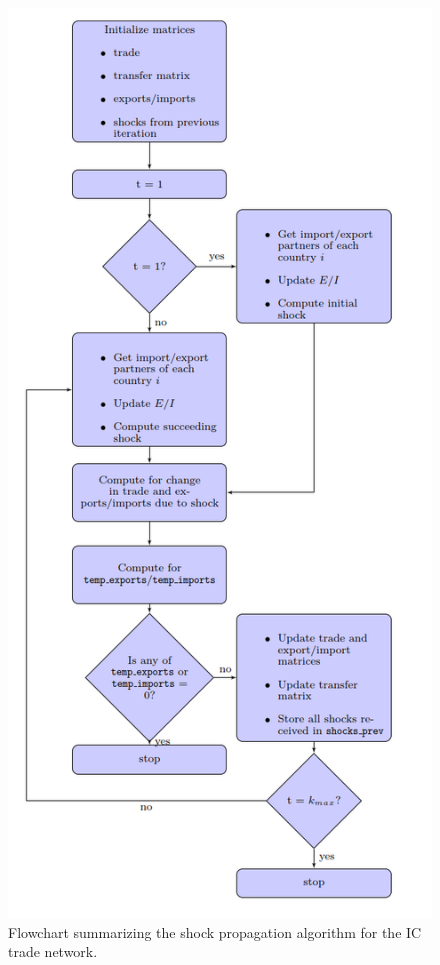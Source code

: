\documentclass[12pt,letterpaper]{report}
\begin{document}
	\begin{figure}[!h]
		\centering
		\includegraphics[scale = 0.7]{Fig401-Flowchart.png}
		\caption{Flowchart summarizing the shock propagation algorithm for the IC trade network.}\label{fig:401Flowchart}
	\end{figure}
	
\end{document}
